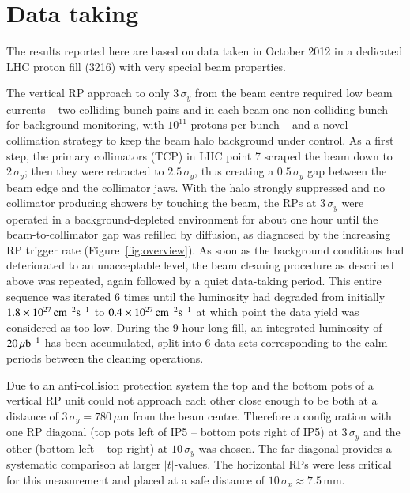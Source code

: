 \section{Data taking}
\label{sec:data taking}

The results reported here are based on data taken in October 2012 
in a dedicated LHC proton fill (3216)
with very special beam properties. 

The vertical RP approach to only $3\,\sigma_{y}$ from the beam centre required
low beam currents -- two colliding bunch pairs and in each beam one 
non-colliding bunch for background monitoring, with $10^{11}$ protons per bunch 
-- and a novel collimation strategy 
to keep the beam halo background under control. As a first step, the primary 
collimators (TCP) in LHC point 7 scraped the beam down to $2\,\sigma_{y}$; then 
they were retracted to $2.5\,\sigma_{y}$, thus creating a $0.5\,\sigma_{y}$ gap 
between
the beam edge and the collimator jaws. With the halo strongly suppressed 
and no collimator producing showers by touching the beam, the RPs at 
$3\,\sigma_{y}$ were operated in a background-depleted environment for about one 
hour until the beam-to-collimator gap was refilled by diffusion, as 
diagnosed by the increasing RP trigger rate (Figure~\ref{fig:overview}). As soon as the background conditions
had deteriorated to an unacceptable level, the beam cleaning procedure as described above was repeated, again followed by a quiet data-taking period.
This entire sequence was iterated 6 times until the luminosity had degraded 
from initially $1.8\times10^{27}\,\rm cm^{-2}s^{-1}$ to 
$0.4\times10^{27}\,\rm cm^{-2}s^{-1}$ %
at which point the data yield was considered as too low. 
During the 9 hour long fill, an integrated luminosity of $20\,\rm \mu b^{-1}$ 
has been accumulated, split into 6 data sets corresponding to the calm periods 
between the cleaning operations. 

Due to an anti-collision protection system the top and the bottom pots of a 
vertical RP unit could not approach each other close enough to be both at a 
distance of $3\,\sigma_{y} = 780\,\mu$m from the beam centre. Therefore a 
configuration with one RP diagonal (top pots left of IP5 -- bottom pots right
of IP5) at $3\,\sigma_{y}$ and the other (bottom left -- top right) at 
$10\,\sigma_{y}$ was chosen. The far diagonal provides a systematic comparison
at larger $|t|$-values.
The horizontal RPs were less critical for this measurement and placed at a
safe distance of $10\,\sigma_{x} \approx 7.5$\,mm.

